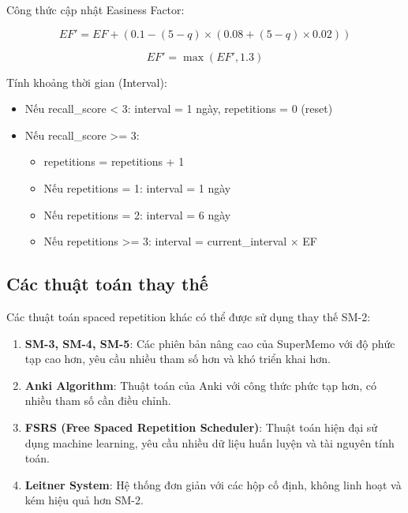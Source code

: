 \documentclass[../DoAn.tex]{subfiles}
\begin{document}
Công thức cập nhật Easiness Factor:

\begin{equation}
EF' = EF + (0.1 - (5 - q) \times (0.08 + (5 - q) \times 0.02))
\end{equation}

\begin{equation}
EF' = \max(EF', 1.3)
\end{equation}

Tính khoảng thời gian (Interval):
\begin{itemize}
    \item Nếu recall\_score < 3: interval = 1 ngày, repetitions = 0 (reset)
    \item Nếu recall\_score >= 3:
    \begin{itemize}
        \item repetitions = repetitions + 1
        \item Nếu repetitions = 1: interval = 1 ngày
        \item Nếu repetitions = 2: interval = 6 ngày
        \item Nếu repetitions >= 3: interval = current\_interval × EF
    \end{itemize}
\end{itemize}

\subsection{Các thuật toán thay thế}

Các thuật toán spaced repetition khác có thể được sử dụng thay thế SM-2:

\begin{enumerate}
    \item \textbf{SM-3, SM-4, SM-5}: Các phiên bản nâng cao của SuperMemo với độ phức tạp cao hơn, yêu cầu nhiều tham số hơn và khó triển khai hơn.
    
    \item \textbf{Anki Algorithm}: Thuật toán của Anki với công thức phức tạp hơn, có nhiều tham số cần điều chỉnh.
    
    \item \textbf{FSRS (Free Spaced Repetition Scheduler)}: Thuật toán hiện đại sử dụng machine learning, yêu cầu nhiều dữ liệu huấn luyện và tài nguyên tính toán.
    
    \item \textbf{Leitner System}: Hệ thống đơn giản với các hộp cố định, không linh hoạt và kém hiệu quả hơn SM-2.
\end{enumerate}
\end{document}

